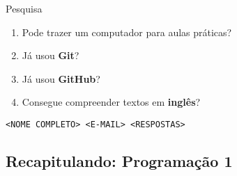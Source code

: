 \documentclass[10pt]{beamer}
\begin{document}
\begin{frame}{Pesquisa}
    
    \begin{enumerate}
    \item Pode trazer um computador para aulas práticas?
    \item Já usou \textbf{Git}?
    \item Já usou \textbf{GitHub}?
    \item Consegue compreender textos em \textbf{inglês}?
    \end{enumerate}
    
    \bigskip
    \bigskip
    
    \centering
    \texttt{<NOME COMPLETO> <E-MAIL> <RESPOSTAS>}
\end{frame}

\subsection{Recapitulando: Programação 1}
\end{document}
